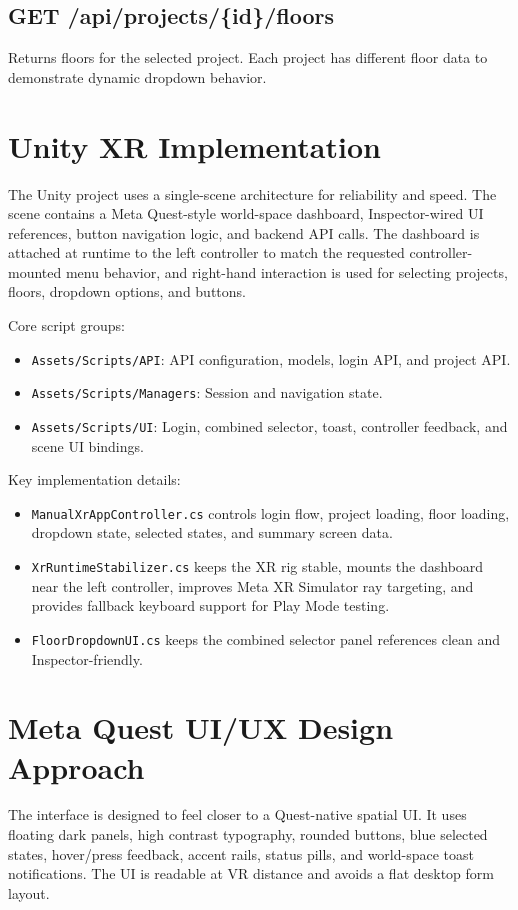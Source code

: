 \documentclass[11pt,a4paper]{article}
\begin{document}
\subsection*{GET /api/projects/\{id\}/floors}
Returns floors for the selected project. Each project has different floor data to demonstrate dynamic dropdown behavior.

\section{Unity XR Implementation}
The Unity project uses a single-scene architecture for reliability and speed. The scene contains a Meta Quest-style world-space dashboard, Inspector-wired UI references, button navigation logic, and backend API calls. The dashboard is attached at runtime to the left controller to match the requested controller-mounted menu behavior, and right-hand interaction is used for selecting projects, floors, dropdown options, and buttons.

Core script groups:
\begin{itemize}
    \item \texttt{Assets/Scripts/API}: API configuration, models, login API, and project API.
    \item \texttt{Assets/Scripts/Managers}: Session and navigation state.
    \item \texttt{Assets/Scripts/UI}: Login, combined selector, toast, controller feedback, and scene UI bindings.
\end{itemize}

Key implementation details:
\begin{itemize}
    \item \texttt{ManualXrAppController.cs} controls login flow, project loading, floor loading, dropdown state, selected states, and summary screen data.
    \item \texttt{XrRuntimeStabilizer.cs} keeps the XR rig stable, mounts the dashboard near the left controller, improves Meta XR Simulator ray targeting, and provides fallback keyboard support for Play Mode testing.
    \item \texttt{FloorDropdownUI.cs} keeps the combined selector panel references clean and Inspector-friendly.
\end{itemize}

\section{Meta Quest UI/UX Design Approach}
The interface is designed to feel closer to a Quest-native spatial UI. It uses floating dark panels, high contrast typography, rounded buttons, blue selected states, hover/press feedback, accent rails, status pills, and world-space toast notifications. The UI is readable at VR distance and avoids a flat desktop form layout.
\end{document}
